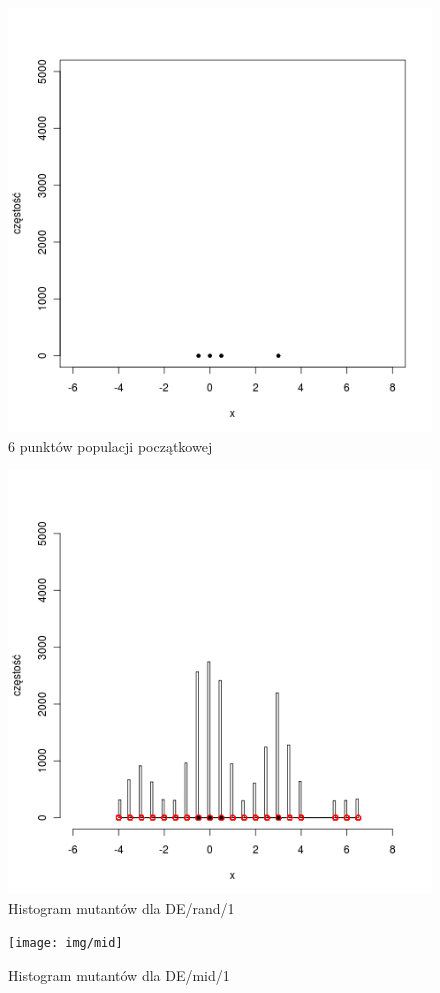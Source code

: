 \documentclass[a4paper,onecolumn,oneside,12pt,wide,floatssmall]{mwrep}
\theoremstyle{definition}
\theoremstyle{plain}%
\theoremstyle{remark}
\begin{document}
\begin{figure}[H]
\centering
\includegraphics[width=.65\textwidth]{img/none}
\caption{6 punktów populacji początkowej} 
\label{fig:sym_none}
\end{figure}

\begin{figure}[H]
\centering
\includegraphics[width=.65\textwidth]{img/rand}
\caption{Histogram mutantów dla DE/rand/1} 
\label{fig:sym_rand}
\end{figure}

\begin{figure}[H]
\centering
\texttt{[image: img/mid]}
\caption{Histogram mutantów dla DE/mid/1} 
\label{fig:sym_mid}
\end{figure}
\end{document}
